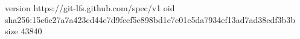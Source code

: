 version https://git-lfs.github.com/spec/v1
oid sha256:15e6e27a7a423cd44e7d9feef5e898bd1e7e01c5da7934ef13ad7ad38edf3b3b
size 43840
